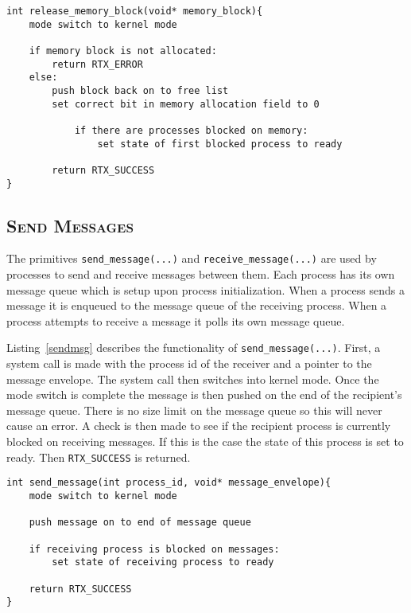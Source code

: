 \documentclass[oneside]{report}
\begin{document}
\begin{lstlisting}
int release_memory_block(void* memory_block){
    mode switch to kernel mode

    if memory block is not allocated:
        return RTX_ERROR
    else:
        push block back on to free list
        set correct bit in memory allocation field to 0

            if there are processes blocked on memory:
                set state of first blocked process to ready

        return RTX_SUCCESS        
}
\end{lstlisting}

\subsection{\textsc{Send Messages}}
The primitives \texttt{send\_message(...)} and \texttt{receive\_message(...)}
are used by processes to send and receive messages between them. Each process
has its own message queue which is setup upon process initialization.
When a process sends a message it is enqueued to the message queue of the
receiving process. When a process attempts to receive a message it polls its
own message queue.

Listing~\ref{sendmsg} describes the functionality of
\texttt{send\_message(...)}.  First, a system call is made with the
process id of the receiver and a pointer to the message envelope. The
system call then switches into kernel mode. Once the mode switch is
complete the message is then pushed on the end of the recipient's
message queue. There is no size limit on the message queue so this
will never cause an error. A check is then made to see if the
recipient process is currently blocked on receiving messages. If this
is the case the state of this process is set to ready. Then
\texttt{RTX\_SUCCESS} is returned.

\begin{lstlisting}
int send_message(int process_id, void* message_envelope){
    mode switch to kernel mode

    push message on to end of message queue

    if receiving process is blocked on messages:
        set state of receiving process to ready

    return RTX_SUCCESS
}
\end{lstlisting}
\end{document}
